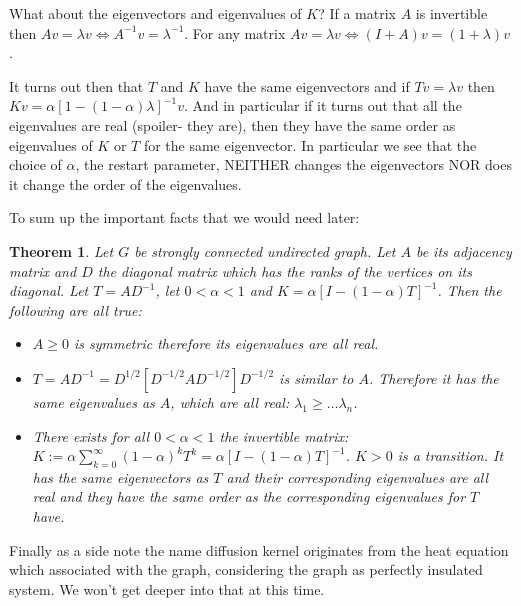 \documentclass[a4paper,10pt]{article}
\newcommand{\R}{\mathbb{R}}
\newcommand{\gt}{>}
\newcommand{\lt}{<}
\theoremstyle{definition}
\theoremstyle{remark}
\theoremstyle{plain}
\newtheorem{thm}{Theorem}[section]
\begin{document}
What about the eigenvectors and eigenvalues of $K$?
If a matrix $A$ is invertible then $Av = \lambda v \iff A^{-1}v = \lambda^{-1}$.
For any matrix $Av = \lambda v \iff (I + A)v = (1+\lambda)v$.

It turns out then that $T$ and $K$ have the same eigenvectors and if $Tv=\lambda
v$ then $K v = \alpha [1 - (1 - \alpha) \lambda]^{-1} v$. And in particular if it
turns out that all the eigenvalues are real (spoiler- they are), then they have
the same order as eigenvalues of $K$ or $T$ for the same eigenvector.
In particular we see that the choice of $\alpha$, the restart parameter, NEITHER 
changes the eigenvectors NOR does it change the order of the eigenvalues.

To sum up the important facts that we would need later:

\begin{thm}
\label{thm:AKTcharacteristics}
Let $G$ be strongly connected undirected graph. Let $A$ be its adjacency matrix
and $D$ the diagonal matrix which has the ranks of the vertices on its diagonal.
Let $T = A D^{-1}$, let $0 \lt \alpha \lt 1$ and 
$K = \alpha [I - (1 - \alpha)T]^{-1}$. Then the following are all true:

\begin{itemize}

\item{}
$A \geq 0$ is symmetric therefore its eigenvalues are all real.

\item{}
$T = AD^{-1} = D^{1/2}[D^{-1/2}AD^{-1/2}]D^{-1/2}$ is similar to $A$. Therefore
it has the same eigenvalues as $A$, which are all real:
$\lambda_1 \geq \dots \lambda_n$.

\item{}
There exists for all $0 \lt \alpha \lt 1$ the invertible matrix: 
$K := \alpha \sum_{k=0}^{\infty} (1 - \alpha)^k T^k = \alpha [I - (1 -
\alpha)T]^{-1}$.
$K \gt 0$ is a transition. It has the same eigenvectors as $T$ and their
corresponding eigenvalues are all real and they have the same order as the
corresponding eigenvalues for $T$ have.
\end{itemize}
\end{thm}

Finally as a side note the name diffusion kernel originates from the heat
equation which associated with the graph, considering the graph 
as perfectly insulated system.
We won't get deeper into that at this time.

\end{document}
